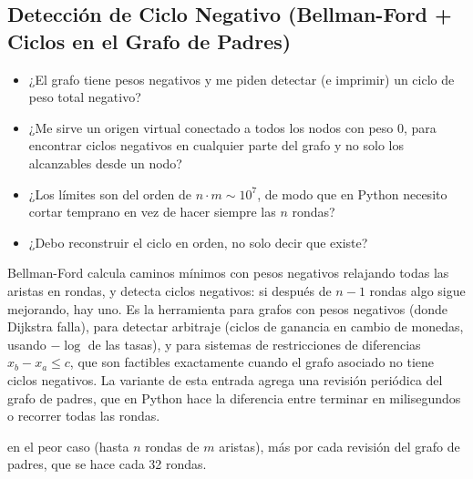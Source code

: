 \subsection{Detección de Ciclo Negativo (Bellman-Ford + Ciclos en el Grafo de Padres)}
\label{alg:4-16}


\begin{itemize}
\item ¿El grafo tiene pesos negativos y me piden detectar (e imprimir) un ciclo de peso total negativo?
\item ¿Me sirve un origen virtual conectado a todos los nodos con peso 0, para encontrar ciclos negativos en cualquier parte del grafo y no solo los alcanzables desde un nodo?
\item ¿Los límites son del orden de $n \cdot m \sim 10^7$, de modo que en Python necesito cortar temprano en vez de hacer siempre las $n$ rondas?
\item ¿Debo reconstruir el ciclo en orden, no solo decir que existe?
\end{itemize}

 Bellman-Ford calcula caminos mínimos con pesos negativos relajando todas las aristas en rondas, y detecta ciclos negativos: si después de $n-1$ rondas algo sigue mejorando, hay uno. Es la herramienta para grafos con pesos negativos (donde Dijkstra falla), para detectar arbitraje (ciclos de ganancia en cambio de monedas, usando $-\log$ de las tasas), y para sistemas de restricciones de diferencias $x_b - x_a \le c$, que son factibles exactamente cuando el grafo asociado no tiene ciclos negativos. La variante de esta entrada agrega una revisión periódica del grafo de padres, que en Python hace la diferencia entre terminar en milisegundos o recorrer todas las rondas.

  en el peor caso (hasta $n$ rondas de $m$ aristas), más  por cada revisión del grafo de padres, que se hace cada 32 rondas.

